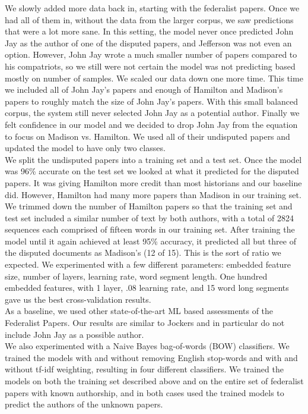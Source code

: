 \documentclass[11pt]{article}
\begin{document}
We slowly added more data back in, starting with the federalist papers. Once we had all of them in, without the data from the larger corpus, we saw predictions that were a lot more sane. In this setting, the model never once predicted John Jay as the author of one of the disputed papers, and Jefferson was not even an option. However, John Jay wrote a much smaller number of papers compared to his compatriots, so we still were not certain the model was not predicting based mostly on number of samples. We scaled our data down one more time. This time we included all of John Jay's papers and enough of Hamilton and Madison's papers to roughly match the size of John Jay's papers. With this small balanced corpus, the system still never selected John Jay as a potential author. Finally we felt confidence in our model and we decided to drop John Jay from the equation to focus on Madison vs. Hamilton. We used all of their undisputed papers and updated the model to have only two classes.\\
We split the undisputed papers into a training set and a test set. Once the model was 96\% accurate on the test set we looked at what it predicted for the disputed papers. It was giving Hamilton more credit than most historians and our baseline did. However, Hamilton had many more papers than Madison in our training set. We trimmed down the number of Hamilton papers so that the training set and test set included a similar number of text by both authors, with a total of 2824 sequences each comprised of fifteen words in our training set. After training the model until it again achieved at least 95\% accuracy, it predicted all but three of the disputed documents as Madison’s (12 of 15). This is the sort of ratio we expected. We experimented with a few different parameters: embedded feature size, number of layers, learning rate, word segment length. One hundred embedded features, with 1 layer, .08 learning rate, and 15 word long segments gave us the best cross-validation results.\\
As a baseline, we used other state-of-the-art ML based assessments of the Federalist Papers. Our results are similar to Jockers and in particular do not include John Jay as a possible author.\\
We also experimented with a Naive Bayes bag-of-words (BOW) classifiers. We trained the models with and without removing English stop-words and with and without tf-idf weighting, resulting in four different classifiers. We trained the models on both the training set described above  and on the entire set of federalist papers with known authorship, and in both cases used the trained models to predict the authors of the unknown papers.
\end{document}
